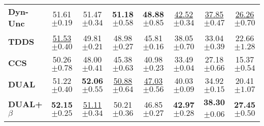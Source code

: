 \begin{table}[ht]
\begin{tabular}{lccccccc}
    \textbf{Dyn-Unc} & 51.61 \scriptsize{$ \pm 0.19 $} & 51.47 \scriptsize{$ \pm 0.34 $} & \textbf{51.18} \scriptsize{$ \pm 0.58 $} & \textbf{48.88} \scriptsize{$ \pm 0.85 $} & \underline{42.52} \scriptsize{$ \pm 0.34 $} & \underline{37.85} \scriptsize{$ \pm 0.47 $} & \underline{26.26} \scriptsize{$ \pm 0.70 $} \\
    
    \textbf{TDDS} & \underline{51.53} \scriptsize{$ \pm 0.40 $} & 49.81 \scriptsize{$ \pm 0.21 $} & 48.98 \scriptsize{$ \pm 0.27 $} & 45.81 \scriptsize{$ \pm 0.16 $} & 38.05 \scriptsize{$ \pm 0.70 $} & 33.04 \scriptsize{$ \pm 0.39 $} & 22.66 \scriptsize{$ \pm 1.28 $} \\
    
    \textbf{CCS} &  50.26 \scriptsize{$ \pm 0.78 $} & 48.00 \scriptsize{$ \pm 0.41 $} & 45.38 \scriptsize{$ \pm 0.63 $} & 40.98 \scriptsize{$ \pm 0.23 $} & 33.49 \scriptsize{$ \pm 0.04 $} & 27.18 \scriptsize{$ \pm 0.66 $} & 15.37 \scriptsize{$ \pm 0.54 $} \\
    
    \midrule
    
    \textbf{DUAL} &  51.22 \scriptsize{$ \pm 0.40 $} & \textbf{52.06} \scriptsize{$ \pm 0.55 $} & \underline{50.88} \scriptsize{$ \pm 0.64 $} & \underline{47.03} \scriptsize{$\pm 0.56 $} & 40.03 \scriptsize{$ \pm 0.09$} & 34.92 \scriptsize{$ \pm 0.15$} &20.41 \scriptsize{$ \pm 1.07$} \\
    
    \textbf{DUAL+$\beta$} & \textbf{52.15} \scriptsize{$ \pm 0.25$} & \underline{51.11} \scriptsize{$ \pm 0.34$} & 50.21 \scriptsize{$ \pm 0.36$} & 46.85 \scriptsize{$ \pm 0.27$} & \textbf{42.97} \scriptsize{$ \pm 0.28$} & \textbf{38.30} \scriptsize{$ \pm $0.06 } & \textbf{27.45} \scriptsize{$ \pm 0.50$} \\
    
    \bottomrule
\end{tabular}
\end{table}
